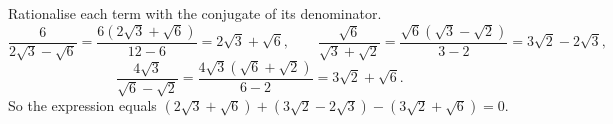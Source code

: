 Rationalise each term with the conjugate of its denominator.
\[
\dfrac{6}{2\sqrt3-\sqrt6}=\dfrac{6\left(2\sqrt3+\sqrt6\right)}{12-6}=2\sqrt3+\sqrt6,\qquad
\dfrac{\sqrt6}{\sqrt3+\sqrt2}=\dfrac{\sqrt6\left(\sqrt3-\sqrt2\right)}{3-2}=3\sqrt2-2\sqrt3,
\]
\[
\dfrac{4\sqrt3}{\sqrt6-\sqrt2}=\dfrac{4\sqrt3\left(\sqrt6+\sqrt2\right)}{6-2}=3\sqrt2+\sqrt6 .
\]
So the expression equals $\left(2\sqrt3+\sqrt6\right)+\left(3\sqrt2-2\sqrt3\right)-\left(3\sqrt2+\sqrt6\right)=\boxed{0}$.
